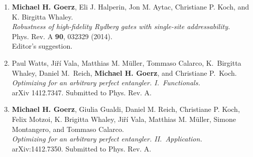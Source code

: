 \begin{enumerate}
  \item
  {\bf Michael H. Goerz}, Eli J. Halperin, Jon M. Aytac, Christiane P. Koch, and K.  Birgitta Whaley. \\
  {\it Robustness of high-fidelity Rydberg gates with single-site addressability.} \\
  Phys. Rev. A {\bf 90}, 032329 (2014). \\
  Editor's suggestion.

  \item
  Paul Watts, Ji\v{r}\'i Vala, Matthias M. M\"uller, Tommaso Calarco, K.\ Birgitta Whaley, Daniel M.\ Reich, {\bf Michael H. Goerz}, and Christiane P.\ Koch. \\
  {\it Optimizing for an arbitrary perfect entangler. I.~Functionals.} \\
  arXiv 1412.7347. Submitted to Phys. Rev. A.

  \item
  {\bf Michael H. Goerz}, Giulia Gualdi, Daniel M. Reich, Christiane P. Koch, Felix Motzoi, K. Brigitta Whaley, Ji\v{r}\'i Vala, Matthias M. M\"uller, Simone Montangero, and Tommaso Calarco. \\
  {\it Optimizing for an arbitrary perfect entangler. II.~Application.} \\
  arXiv:1412.7350. Submitted to Phys. Rev. A.

\end{enumerate}

